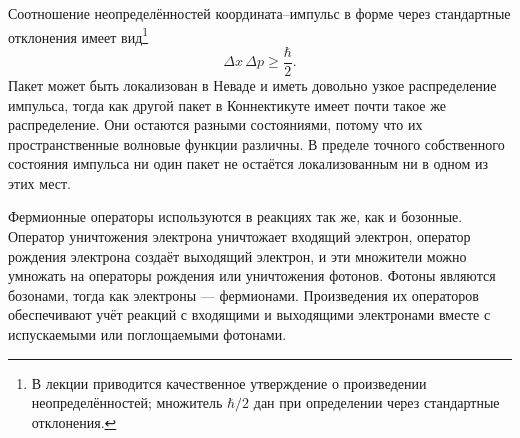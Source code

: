 \begin{classroomqa}
\end{classroomqa}

\begin{classroomqa}
\end{classroomqa}

Соотношение неопределённостей координата--импульс в форме через стандартные отклонения имеет вид\footnote{В лекции приводится качественное утверждение о произведении неопределённостей; множитель \(\hbar/2\) дан при определении через стандартные отклонения.}
\begin{equation}
\Delta x\,\Delta p\geq\frac{\hbar}{2}.
\end{equation}
Пакет может быть локализован в Неваде и иметь довольно узкое распределение импульса, тогда как другой пакет в Коннектикуте имеет почти такое же распределение. Они остаются разными состояниями, потому что их пространственные волновые функции различны. В пределе точного собственного состояния импульса ни один пакет не остаётся локализованным ни в одном из этих мест.

Фермионные операторы используются в реакциях так же, как и бозонные. Оператор уничтожения электрона уничтожает входящий электрон, оператор рождения электрона создаёт выходящий электрон, и эти множители можно умножать на операторы рождения или уничтожения фотонов. Фотоны являются бозонами, тогда как электроны — фермионами. Произведения их операторов обеспечивают учёт реакций с входящими и выходящими электронами вместе с испускаемыми или поглощаемыми фотонами.

